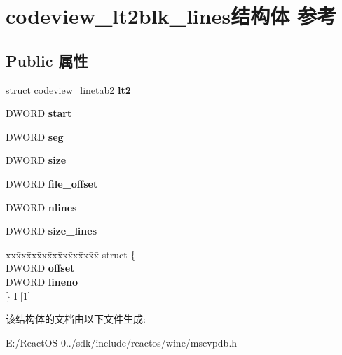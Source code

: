 \hypertarget{structcodeview__lt2blk__lines}{}\section{codeview\+\_\+lt2blk\+\_\+lines结构体 参考}
\label{structcodeview__lt2blk__lines}
\subsection*{Public 属性}
\begin{DoxyCompactItemize}
\item 
\mbox{\label{structcodeview__lt2blk__lines_a5ac0d1ed756cb6ee146769312ae3cf77}} 
\hyperlink{interfacestruct}{struct} \hyperlink{structcodeview__linetab2}{codeview\+\_\+linetab2} {\bfseries lt2}
\item 
\mbox{\label{structcodeview__lt2blk__lines_a4ed219ab07c28b4dc1339c91f6b681d2}} 
D\+W\+O\+RD {\bfseries start}
\item 
\mbox{\label{structcodeview__lt2blk__lines_a791b5b67623f64b252a92d1dc6cdf5e6}} 
D\+W\+O\+RD {\bfseries seg}
\item 
\mbox{\label{structcodeview__lt2blk__lines_a10888e6f42da7d73233454c0e507b55c}} 
D\+W\+O\+RD {\bfseries size}
\item 
\mbox{\label{structcodeview__lt2blk__lines_afcfc6c15acb7ed877d549ff3c7657970}} 
D\+W\+O\+RD {\bfseries file\+\_\+offset}
\item 
\mbox{\label{structcodeview__lt2blk__lines_a3875d1e723108de1a82c951547e1276f}} 
D\+W\+O\+RD {\bfseries nlines}
\item 
\mbox{\label{structcodeview__lt2blk__lines_a0a803706d6cde5631d780ce298deddcf}} 
D\+W\+O\+RD {\bfseries size\+\_\+lines}
\item 
\mbox{\label{structcodeview__lt2blk__lines_a1846e04d23a504ea1a3417e573d31b65}} 
\begin{tabbing}
xx\=xx\=xx\=xx\=xx\=xx\=xx\=xx\=xx\=\kill
struct \{\\
\>DWORD {\bfseries offset}\\
\>DWORD {\bfseries lineno}\\
\} {\bfseries l} \mbox{[}1\mbox{]}\\

\end{tabbing}\end{DoxyCompactItemize}


该结构体的文档由以下文件生成\+:\begin{DoxyCompactItemize}
\item 
E\+:/\+React\+O\+S-\/0../sdk/include/reactos/wine/mscvpdb.\+h\end{DoxyCompactItemize}
